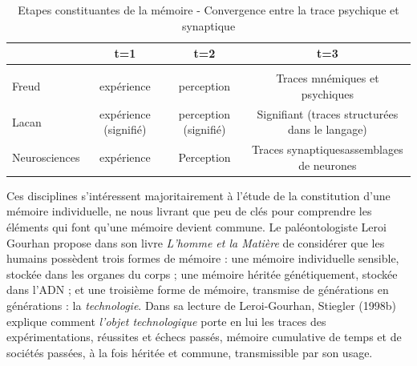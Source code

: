 \begin{table}[ht]
    \centering
    \begin{tabulary}{\textwidth}{L|C C C}
        
        ~ & t=1  & t=2  & t=3 \\[2ex]
        
        \hline \\ [-1.5ex]
    
        Freud  & expérience  & perception  & Traces mnémiques et psychiques \\[3ex]

        Lacan & expérience (signifié)  &   perception (signifié)  &   Signifiant (traces structurées dans le langage) \\[3ex]

        Neurosciences &  expérience & Perception & Traces synaptiquesassemblages de neurones \\[3ex]

    \end{tabulary}

    \caption{ Etapes constituantes de la mémoire - Convergence entre la trace psychique et synaptique \citep{Ansermet2004} }
\end{table}

Ces disciplines s{\textquoteright}intéressent majoritairement à l{\textquoteright}étude de la constitution d{\textquoteright}une mémoire individuelle, ne nous livrant que peu de clés pour comprendre les éléments qui font qu{\textquoteright}une mémoire devient commune. Le paléontologiste Leroi Gourhan propose dans son livre \textit{L{\textquoteright}homme et la Matière} \citeyear{Leroi-Gourhan1971} de considérer que les humains possèdent trois formes de mémoire : une mémoire individuelle sensible, stockée dans les organes du corps ; une mémoire héritée génétiquement, stockée dans l{\textquoteright}ADN ; et une troisième forme de mémoire, transmise de générations en générations : la \textit{technologie}. Dans sa lecture de Leroi-Gourhan, Stiegler (1998b) explique comment \textit{l{\textquoteright}objet technologique} porte en lui les traces des expérimentations, réussites et échecs passés, mémoire cumulative de temps et de sociétés passées, à la fois héritée et commune, transmissible par son usage.

